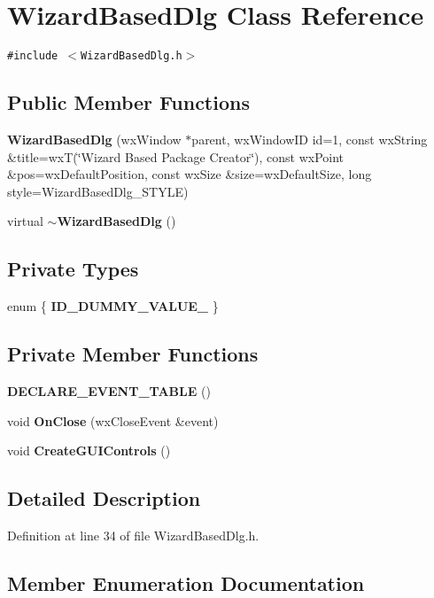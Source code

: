\section{Wizard\-Based\-Dlg Class Reference}
\label{class_wizard_based_dlg}
{\tt \#include $<$Wizard\-Based\-Dlg.h$>$}

\subsection*{Public Member Functions}
\begin{CompactItemize}
\item 
{\bf Wizard\-Based\-Dlg} (wx\-Window $\ast$parent, wx\-Window\-ID id=1, const wx\-String \&title=wx\-T(\char`\"{}Wizard Based Package Creator\char`\"{}), const wx\-Point \&pos=wx\-Default\-Position, const wx\-Size \&size=wx\-Default\-Size, long style=Wizard\-Based\-Dlg\_\-STYLE)
\item 
virtual {\bf $\sim$Wizard\-Based\-Dlg} ()
\end{CompactItemize}
\subsection*{Private Types}
\begin{CompactItemize}
\item 
enum \{ {\bf ID\_\-DUMMY\_\-VALUE\_\-}
 \}
\end{CompactItemize}
\subsection*{Private Member Functions}
\begin{CompactItemize}
\item 
{\bf DECLARE\_\-EVENT\_\-TABLE} ()
\item 
void {\bf On\-Close} (wx\-Close\-Event \&event)
\item 
void {\bf Create\-GUIControls} ()
\end{CompactItemize}


\subsection{Detailed Description}




Definition at line 34 of file Wizard\-Based\-Dlg.h.

\subsection{Member Enumeration Documentation}
